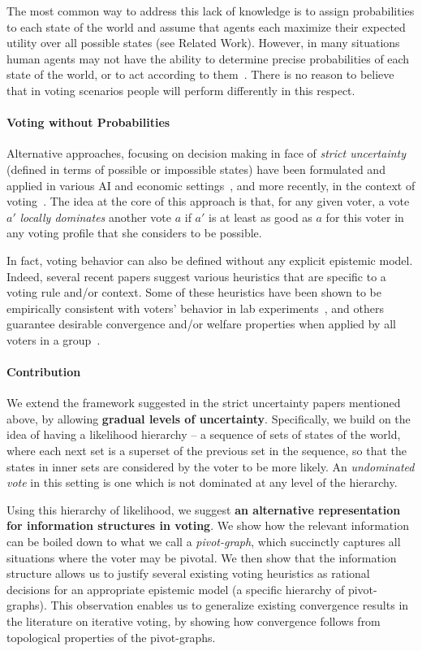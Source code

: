 \documentclass[letterpaper]{article} %
\begin{document}
The most common way to address this lack of knowledge is to assign probabilities to each state of the world and assume that agents each maximize their expected utility over all possible states (see Related Work). However, in many situations human agents may not have the ability to determine precise probabilities of each state of the world, or to act according to them~\cite{TK74,chater2006probabilistic}. There is no reason to believe that in voting scenarios people will perform differently in this respect. 

\paragraph{Voting without Probabilities}
Alternative approaches, focusing on decision making in face of \emph{strict uncertainty} (defined in terms of possible or impossible states) have been formulated and applied in various AI and economic settings~\cite{dow1994nash,boutilier1994toward,Hal97,matt2009dominant}, and more recently, in the context of voting~\cite{CWX11,RE12,MLR14}. The idea at the core of this approach is that, for any given voter, a vote $a'$ \emph{locally dominates} another vote $a$ if $a'$ is at least as good as $a$ for this voter in any voting profile that she considers to be possible.

In fact, voting behavior can also be defined without any explicit epistemic model. Indeed, several recent papers suggest various heuristics that are specific to a voting rule and/or context. Some of these heuristics have been shown to be empirically consistent with voters' behavior in lab experiments~\cite{laslier2010laboratory}, and others guarantee desirable convergence and/or welfare properties when applied by all voters in a group~\cite{GLRVW13}.

\paragraph{Contribution}
We extend the framework suggested in the strict uncertainty papers mentioned above, by allowing \textbf{gradual levels of uncertainty}. Specifically, we build on the idea of having a likelihood hierarchy -- a sequence of sets of states of the world, where each next set is a superset of the previous set in the sequence, so that the states in inner sets are considered by the voter to be more likely. An \emph{undominated vote} in this setting is one which is not dominated at any level of the hierarchy.

Using this hierarchy of likelihood, we suggest \textbf{an alternative representation for information structures in voting}. We show how the relevant information can be boiled down to what we call a \emph{pivot-graph}, which succinctly captures all situations where the voter may be pivotal. We then show that the information structure allows us to justify several existing voting heuristics as rational decisions for an appropriate epistemic model (a specific hierarchy of pivot-graphs). This observation enables us to generalize existing convergence results in the literature on iterative voting, by showing how convergence follows from topological properties of the pivot-graphs.
\end{document}
